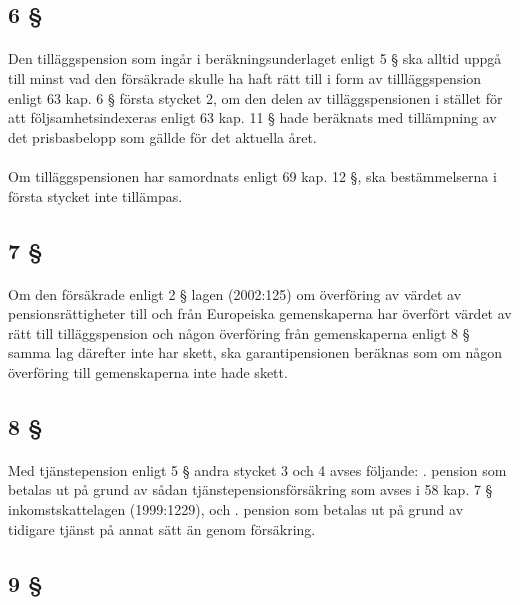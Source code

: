 \documentclass[a4paper,notitlepage,openany,10pt]{book}
\begin{document}
\subsection*{6 §}
\paragraph*{}
Den tilläggspension som ingår i beräkningsunderlaget enligt 5 § ska alltid uppgå till minst vad den försäkrade skulle ha haft rätt till i form av tillläggspension enligt 63 kap. 6 § första stycket 2, om den delen av tilläggspensionen i stället för att följsamhetsindexeras enligt 63 kap. 11 § hade beräknats med tillämpning av det prisbasbelopp som gällde för det aktuella året.
\paragraph*{}
Om tilläggspensionen har samordnats enligt 69 kap. 12 §, ska bestämmelserna i första stycket inte tillämpas.
\subsection*{7 §}
\paragraph*{}
Om den försäkrade enligt 2 § lagen (2002:125) om överföring av värdet av pensionsrättigheter till och från Europeiska gemenskaperna har överfört värdet av rätt till tilläggspension och någon överföring från gemenskaperna enligt 8 § samma lag därefter inte har skett, ska garantipensionen beräknas som om någon överföring till gemenskaperna inte hade skett.
\subsection*{8 §}
\paragraph*{}
Med tjänstepension enligt 5 § andra stycket 3 och 4 avses följande:
. pension som betalas ut på grund av sådan tjänstepensionsförsäkring som avses i 58 kap. 7 § inkomstskattelagen (1999:1229), och
. pension som betalas ut på grund av tidigare tjänst på annat sätt än genom försäkring.
\subsection*{9 §}
\end{document}

